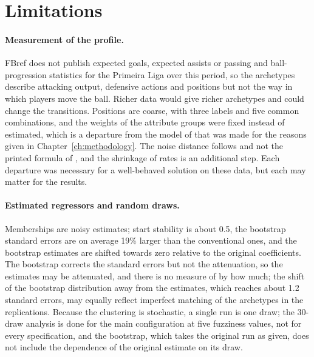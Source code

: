 \section{Limitations}
\label{sec:disc-limitations}

\paragraph{Measurement of the profile.} FBref does not publish expected goals, expected assists or passing and ball-progression statistics for the Primeira Liga over this period, so the archetypes describe attacking output, defensive actions and positions but not the way in which players move the ball. Richer data would give richer archetypes and could change the transitions. Positions are coarse, with three labels and five common combinations, and the weights of the attribute groups were fixed instead of estimated, which is a departure from the model of  that was made for the reasons given in Chapter~\ref{ch:methodology}. The noise distance follows  and not the printed formula of , and the shrinkage of rates is an additional step. Each departure was necessary for a well-behaved solution on these data, but each may matter for the results.

\paragraph{Estimated regressors and random draws.} Memberships are noisy estimates; start stability is about 0.5, the bootstrap standard errors are on average 19\% larger than the conventional ones, and the bootstrap estimates are shifted towards zero relative to the original coefficients. The bootstrap corrects the standard errors but not the attenuation, so the estimates may be attenuated, and there is no measure of by how much; the shift of the bootstrap distribution away from the estimates, which reaches about 1.2 standard errors, may equally reflect imperfect matching of the archetypes in the replications. Because the clustering is stochastic, a single run is one draw; the 30-draw analysis is done for the main configuration at five fuzziness values, not for every specification, and the bootstrap, which takes the original run as given, does not include the dependence of the original estimate on its draw.


